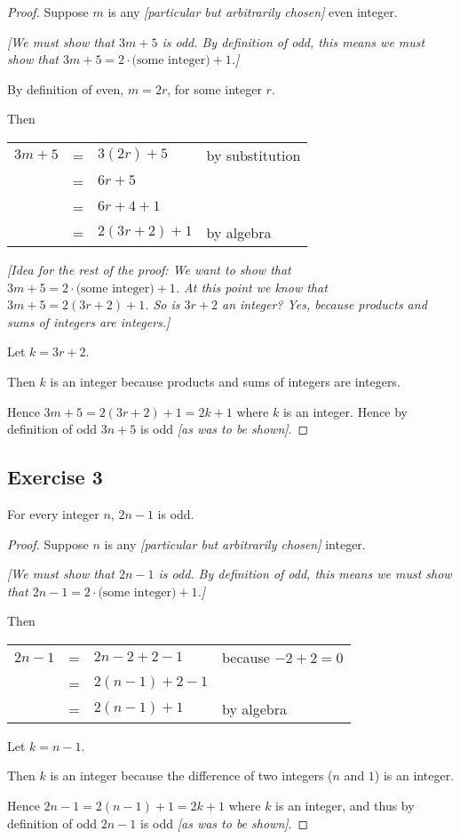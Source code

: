 \documentclass[14pt]{extarticle}
\begin{document}
\begin{proof}
Suppose $m$ is any {\it [particular but arbitrarily chosen]} even integer. 

{\it [We must show that $3m + 5$ is odd. By definition of odd, this means we must show that $3m + 5 = 2\cdot\text{(some integer)} + 1$.]}

By definition of even, $m = 2r$, for some integer $r$. 

Then

\begin{center}
\begin{tabular}{rcll}
$3m + 5$ & = & $3(2r) + 5$ & \color{cyan} by substitution \\
& = & $6r + 5$ & \\
& = & $6r + 4 + 1$ & \\
& = & $2(3r + 2) + 1$ & \color{cyan} by algebra \\
\end{tabular}
\end{center}

{\it [Idea for the rest of the proof: We want to show that $3m + 5 = 2\cdot\text{(some integer)} + 1$. At this point we know that $3m + 5 = 2(3r + 2) + 1$. So is $3r + 2$ an integer? Yes, because products and sums of integers are integers.]}

Let $k = 3r + 2$. 

Then $k$ is an integer because products and sums of integers are integers. 

Hence $3m + 5 = 2(3r+2) + 1 = 2k + 1$ where $k$ is an integer. Hence by definition of odd $3n+5$ is odd {\it [as was to be shown]}.
\end{proof}

\subsection{Exercise 3}
For every integer $n$, $2n - 1$ is odd.

\begin{proof}
Suppose $n$ is any {\it [particular but arbitrarily chosen]} integer. 

{\it [We must show that $2n - 1$ is odd. By definition of odd, this means we must show that $2n - 1 = 2 \cdot \text{(some integer)} + 1$.]}

Then

\begin{center}
\begin{tabular}{rcll}
$2n-1$ & = & $2n - 2 + 2 - 1$ & \color{cyan} because $-2 + 2 = 0$ \\
& = & $2(n-1) + 2 - 1$ & \\
& = & $2(n-1) + 1$ & \color{cyan} by algebra \\
\end{tabular}
\end{center}

Let $k = n-1$. 

Then $k$ is an integer because the difference of two integers ($n$ and $1$) is an integer. 

Hence $2n-1 = 2(n-1) + 1 = 2k + 1$ where $k$ is an integer, and thus by definition of odd $2n-1$ is odd {\it [as was to be shown]}.
\end{proof}
\end{document}
